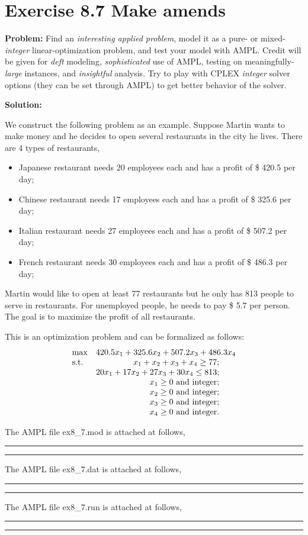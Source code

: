 \section{Exercise 8.7 Make amends}
\textbf{Problem:} Find an \textit{interesting applied problem}, model it as a pure- or mixed-\textit{integer} linear-optimization problem, and test your model with AMPL. Credit will be given for \textit{deft} modeling, \textit{sophisticated} use of AMPL, testing on meaningfully-\textit{large} instances, and \textit{insightful} analysis. Try to play with CPLEX \textit{integer} solver options (they can be set through AMPL) to get better behavior of the solver.

\textbf{Solution:} 

We construct the following problem as an example. Suppose Martin wants to make money and he decides to open several restaurants in the city he lives. There are 4 types of restaurants, 
\begin{itemize}
\item Japanese restaurant needs 20 employees each and has a profit of \$ 420.5 per day;
\item Chinese restaurant needs 17 employees each and has a profit of \$ 325.6 per day;
\item Italian restaurant needs 27 employees each and has a profit of \$ 507.2 per day;
\item French restaurant needs 30 employees each and has a profit of \$ 486.3 per day;
\end{itemize}

Martin would like to open at least 77 restaurants but he only has 813 people to serve in restaurants. For unemployed people, he needs to pay \$ 5.7 per person. The goal is to maximize the profit of all restaurants. 

This is an optimization problem and can be formalized as follows:
\begin{equation}
\label{eq: martin}
  \begin{array}{lrcll}
    \max
    & \multicolumn{4}{l}{420.5x_1+325.6x_2+507.2x_3+486.3x_4} \\
    \text{s.t.}
    & x_1+x_2+x_3+x_4\geq{}77; \\
    & 20x_1+17x_2+27x_3+30x_4\leq{}813; \\
    & x_1 \geq 0 \text{ and integer};\\
    & x_2 \geq 0 \text{ and integer};\\
    & x_3 \geq 0 \text{ and integer};\\
    & x_4 \geq 0 \text{ and integer}.\\
  \end{array}
\end{equation}

The AMPL file ex8\_7.mod is attached at follows,
\bigskip
\hrule 
\small

\normalsize
\hrule
\bigskip

The AMPL file ex8\_7.dat is attached at follows,
\bigskip
\hrule 
\small

\normalsize
\hrule
\bigskip

The AMPL file ex8\_7.run is attached at follows,
\bigskip
\hrule 
\small

\normalsize
\hrule
\bigskip
